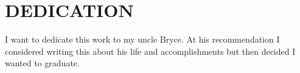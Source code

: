 \chapter*{DEDICATION}

I want to dedicate this work to my uncle Bryce. At his 
recommendation I considered writing this about his life and accomplishments but 
then decided I wanted to graduate.


